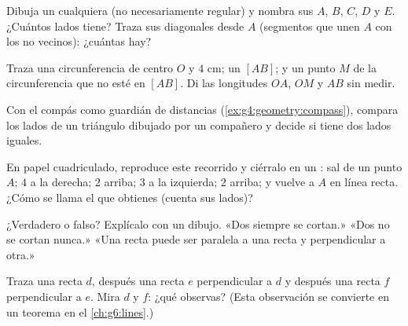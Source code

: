 \begin{exercise}[$\star$]\label{exo:g4:geometry:4}
Dibuja un  cualquiera (no necesariamente regular) y nombra sus 
$A$, $B$, $C$, $D$ y $E$. ¿Cuántos lados tiene? Traza sus
diagonales desde $A$ (segmentos que unen $A$ con los  no vecinos):
¿cuántas hay?
\end{exercise}

\begin{exercise}[$\star$]\label{exo:g4:geometry:5}
Traza una circunferencia de centro $O$ y  $4$ cm; un  $[AB]$;
y un punto $M$ de la circunferencia que no esté en $[AB]$. Di las longitudes $OA$,
$OM$ y $AB$ sin medir.
\end{exercise}

\begin{exercise}[$\star$]\label{exo:g4:geometry:6}
Con el compás como guardián de distancias
(\cref{ex:g4:geometry:compass}), compara los lados de un triángulo
dibujado por un compañero y decide si tiene dos lados iguales.
\end{exercise}

\begin{exercise}[$\star$]\label{exo:g4:geometry:7}
En papel cuadriculado, reproduce este recorrido y ciérralo en un :
sal de un punto $A$; $4$ a la derecha; $2$ arriba; $3$ a la izquierda; $2$ arriba;
y vuelve a $A$ en línea recta. ¿Cómo se llama el 
que obtienes (cuenta sus lados)?
\end{exercise}

\begin{exercise}[$\star$]\label{exo:g4:geometry:8}
¿Verdadero o falso? Explícalo con un dibujo.
«Dos  siempre se cortan.»
«Dos  no se cortan nunca.»
«Una recta puede ser paralela a una recta y perpendicular a
otra.»
\end{exercise}

\begin{exercise}[$\star\star$]\label{exo:g4:geometry:9}
Traza una recta $d$, después una recta $e$ perpendicular a $d$ y después una recta
$f$ perpendicular a $e$. Mira $d$ y $f$: ¿qué observas?
(Esta observación se convierte en un teorema en el \cref{ch:g6:lines}.)
\end{exercise}

